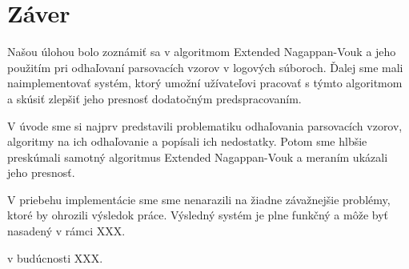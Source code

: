 \chapter{Záver}
Našou úlohou bolo zoznámiť sa v algoritmom Extended Nagappan-Vouk a jeho použitím pri odhaľovaní parsovacích vzorov v logových súboroch. Ďalej sme mali naimplementovať systém, ktorý umožní užívateľovi pracovať s týmto algoritmom a skúsiť zlepšiť jeho presnosť dodatočným predspracovaním.
\par V úvode sme si najprv predstavili problematiku odhaľovania parsovacích vzorov, algoritmy na ich odhaľovanie a popísali ich nedostatky. Potom sme hlbšie preskúmali samotný algoritmus Extended Nagappan-Vouk a meraním ukázali jeho presnosť. 
\par V priebehu implementácie sme sme nenarazili na žiadne závažnejšie problémy, ktoré by ohrozili výsledok práce. Výsledný systém je plne funkčný a môže byť nasadený v rámci XXX.
\par v budúcnosti XXX.